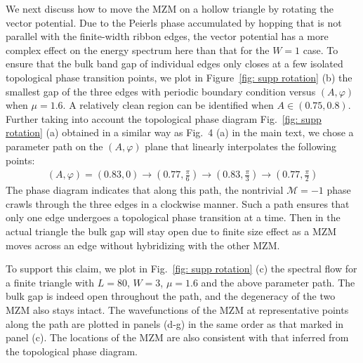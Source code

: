 \documentclass[aps,prb,showpacs,amsmath,amssymb,superscriptaddress]{revtex4-2}
\begin{document}
We next discuss how to move the MZM on a hollow triangle by rotating the vector potential. Due to the Peierls phase accumulated by hopping that is not parallel with the finite-width ribbon edges, the vector potential has a more complex effect on the energy spectrum here than that for the $W=1$ case. To ensure that the bulk band gap of individual edges only closes at a few isolated topological phase transition points, we plot in Figure~\ref{fig: supp rotation} (b) the smallest gap of the three edges with periodic boundary condition versus $(A,\varphi)$ when $\mu=1.6$. A relatively clean region can be identified when $A\in (0.75,0.8)$. Further taking into account the topological phase diagram Fig.~\ref{fig: supp rotation} (a) obtained in a similar way as Fig.~4 (a) in the main text, we chose a parameter path on the $(A,\varphi)$ plane that linearly interpolates the following points:
\begin{eqnarray}\label{eq:w3path}
   (A,\varphi) = (0.83,0)\rightarrow \left(0.77,\frac{\pi}{6}\right) \rightarrow \left(0.83,\frac{\pi}{3}\right)\rightarrow \left(0.77,\frac{\pi}{2}\right)
\end{eqnarray}
The phase diagram indicates that along this path, the nontrivial $\mathcal{M}=-1$ phase crawls through the three edges in a clockwise manner. Such a path ensures that only one edge undergoes a topological phase transition at a time. Then in the actual triangle the bulk gap will stay open due to finite size effect as a MZM moves across an edge without hybridizing with the other MZM.

To support this claim, we plot in Fig.~\ref{fig: supp rotation} (c) the spectral flow for a finite triangle with $L=80$, $W=3$, $\mu=1.6$ and the above parameter path. The bulk gap is indeed open throughout the path, and the degeneracy of the two MZM also stays intact. The wavefunctions of the MZM at representative points along the path are plotted in panels (d-g) in the same order as that marked in panel (c). The locations of the MZM are also consistent with that inferred from the topological phase diagram.
\end{document}
